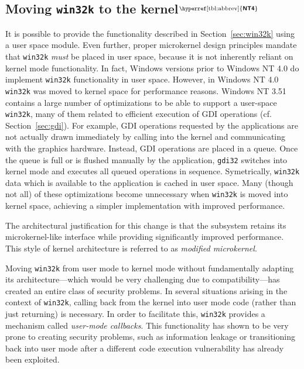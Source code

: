 \documentclass[10pt,twocolumn,a4paper]{article}
\newcommand{\bs}[1]{\textbf{\sffamily #1}}
\newcommand{\winver}[1]{$^{\text{\hyperref[tbl:abbrev]{\bs{#1}}}}$}
\newcommand{\winsubsection}[2]{\subsection[#1]{#1\winver{#2}}}
\begin{document}
		\winsubsection{Moving \texttt{win32k} to the kernel}{NT4}
			It is possible to provide the functionality described in Section~\ref{sec:win32k}
			using a user space module. Even further, proper microkernel design principles
			mandate that \texttt{win32k} \emph{must} be placed in user space, because
			it is not inherently reliant on kernel mode functionality.
			In fact, Windows versions prior to Windows NT 4.0
			do implement \texttt{win32k} functionality in user space. However,
			in Windows NT 4.0 \texttt{win32k} was moved to kernel space for
			performance reasons. Windows NT 3.51 contains a large number of optimizations
			to be able to support a user-space \texttt{win32k}, many of them related
			to efficient execution of GDI operations (cf. Section~\ref{sec:gdi}).
			For example, GDI operations requested by the applications are not
			actually drawn immediately by calling into the kernel and communicating
			with the graphics hardware. Instead, GDI operations are placed in a
			queue. Once the queue is full or is flushed manually by the application,
			\texttt{gdi32} switches
			into kernel mode and executes all queued operations
			in sequence. Symetrically, \texttt{win32k} data which is available to the application
			is cached in user space.
			Many (though not all) of these optimizations become unnecessary when
			\texttt{win32k} is moved into kernel space, achieving a simpler implementation
			with improved performance.
			\cite{gdikernel}

			The architectural justification for this change is that the subsystem
			retains its microkernel-like interface while providing significantly
			improved performance. This style of kernel architecture is referred
			to as \emph{modified microkernel}. \cite{gdikernel}

			Moving \texttt{win32k} from user mode to kernel mode without fundamentally
			adapting its architecture---which would be very challenging due to
			compatibility---has created an entire class of security problems.
			In several situations arising in the context of \texttt{win32k},
			calling back from the kernel into user mode code (rather than just
			returning) is necessary. In order to facilitate this, \texttt{win32k}
			provides a mechanism called \textit{user-mode callbacks}. This
			functionality has shown to be very prone to creating security problems,
			such as information leakage or transitioning back into user mode after
			a different code execution vulnerability has already been exploited.
			\cite{mandy2011kernel}
\end{document}
